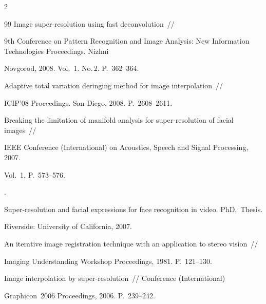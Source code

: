 \begin{multicols}{2}
{{\begin{thebibliography}{99}
Image super-resolution using fast deconvolution~// 


9th Conference on Pattern Recognition and Image Analysis: New Information Technologies Proceedings. Nizhni 


Novgorod, 2008. Vol.~1. No.\,2. P.~362--364.









Adaptive total variation deringing method for image interpolation~// 


ICIP'08 Proceedings. San Diego, 2008. P.~2608--2611.









Breaking the limitation of manifold analysis for super-resolution of facial images~//


IEEE  Conference (International) on Acoustics, Speech and Signal Processing, 2007.


Vol.~1. P.~573--576.







. 


Super-resolution and facial expressions for face recognition in video. PhD.\ Thesis. 


Riverside: University of California, 2007.









An iterative image registration technique with an application to stereo vision~// 


Imaging Understanding Workshop Proceedings, 1981. P.~121--130.





\label{end\stat}









Image interpolation by super-resolution~// Conference (International) 


Graphicon~2006 Proceedings, 2006. P.~239--242.





\end{thebibliography}


}


}


\end{multicols}  





 


 


 


